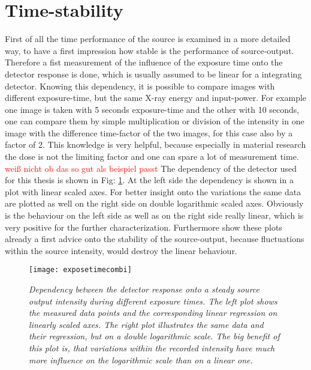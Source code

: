 \section{Time-stability}\label{sec:time}
First of all the time performance of the source is examined in a more detailed way, to have a first impression how stable is the performance of source-output. Therefore a fist measurement of the influence of the exposure time onto the detector response is done, which is usually assumed to be linear for a integrating detector. Knowing this dependency, it is possible to compare images with different exposure-time, but the same X-ray energy and input-power. For example one image is taken with 5 seconds exposure-time and the other with 10 seconds, one can compare them by simple multiplication or division of the intensity in one image with the difference time-factor of the two images, for this case also by a factor of 2. This knowledge is very helpful, because especially in material research the dose is not the limiting factor and one can spare a lot of measurement time. \textcolor{red}{weiß nicht ob das so gut als beispiel passt} The dependency of the detector used for this thesis is shown in Fig: \ref{exposetime}. At the left side the dependency is shown in a plot with linear scaled axes. For better insight onto the variations the same data are plotted as well on the right side on double logarithmic scaled axes. Obviously is the behaviour on the left side as well as on the right side really linear, which is very positive for the further characterization. Furthermore show these plots already a first advice onto the stability of the source-output, because fluctuations within the source intensity, would destroy the linear behaviour.
\begin{figure}[h]
	\begin{center}
		\texttt{[image: exposetimecombi]}
	\end{center}
	\caption[Dependency of the detector response onto the exposure time]{\textit{Dependency between the detector response onto a steady source output intensity during different exposure times. The left plot shows the measured data points and the corresponding linear regression on linearly scaled axes. The right plot illustrates the same data and their regression, but on a double logarithmic scale. The big benefit of this plot is, that variations within the recorded intensity have much more influence on the logarithmic scale than on a linear one.}}
	\label{exposetime}
\end{figure}

